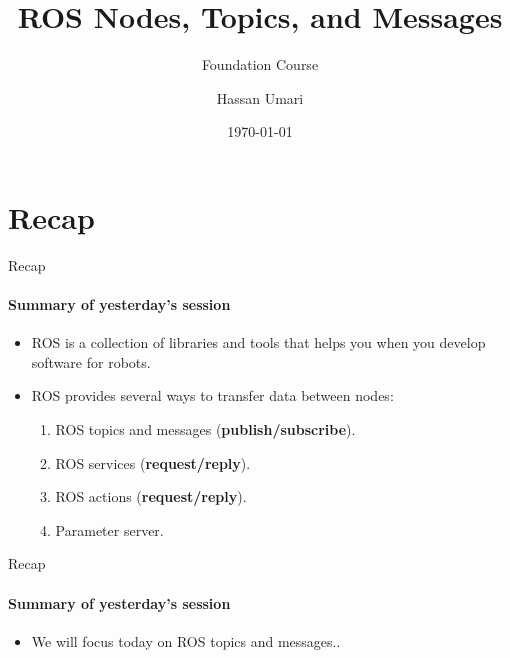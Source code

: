 \documentclass{beamer}
\author[MAS]{Hassan Umari}
\title{ROS Nodes, Topics, and Messages}
\subtitle{Foundation Course}
\institute[HBRS]{Hochschule Bonn-Rhein-Sieg}
\date{\today}
\begin{document}
{
\begin{frame}
\titlepage
\end{frame}
}


\section{Recap}
\begin{frame}{Recap}
    \framesubtitle{Summary of yesterday's session}
    \begin{itemize}
        \item ROS is a collection of libraries and tools that helps you when you develop software for robots.
              
        \item ROS provides several ways to transfer data between nodes:
        
        \begin{enumerate}
            \item ROS topics and messages (\textbf{publish/subscribe}).
            \item ROS services (\textbf{request/reply}).
            \item ROS actions (\textbf{request/reply}).
            \item Parameter server.
        \end{enumerate}   
    \end{itemize}
\end{frame}


\begin{frame}{Recap}
    \framesubtitle{Summary of yesterday's session}
    \begin{itemize}
        \item We will focus today on ROS topics and messages..
    \end{itemize}
\end{frame}
\end{document}
